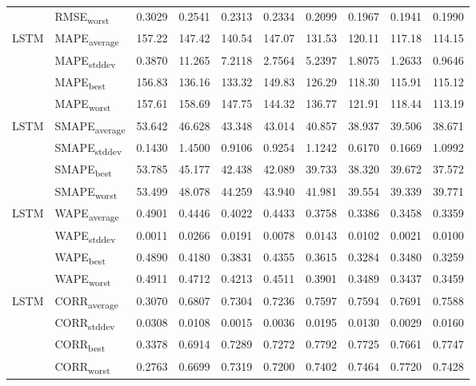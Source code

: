 {\begin{longtable}{l l c c c c c c c c}
 & RMSE\textsubscript{worst} & 0.3029 & 0.2541 & 0.2313 & 0.2334 & 0.2099 & 0.1967 & 0.1941 & 0.1990 \\
\cmidrule(lr){2-10}
\multirow{4}{*}{LSTM} & MAPE\textsubscript{average} & 157.22 & 147.42 & 140.54 & 147.07 & 131.53 & 120.11 & 117.18 & 114.15 \\
 & MAPE\textsubscript{stddev} & 0.3870 & 11.265 & 7.2118 & 2.7564 & 5.2397 & 1.8075 & 1.2633 & 0.9646 \\
 & MAPE\textsubscript{best} & 156.83 & 136.16 & 133.32 & 149.83 & 126.29 & 118.30 & 115.91 & 115.12 \\
 & MAPE\textsubscript{worst} & 157.61 & 158.69 & 147.75 & 144.32 & 136.77 & 121.91 & 118.44 & 113.19 \\
\cmidrule(lr){2-10}
\multirow{4}{*}{LSTM} & SMAPE\textsubscript{average} & 53.642 & 46.628 & 43.348 & 43.014 & 40.857 & 38.937 & 39.506 & 38.671 \\
 & SMAPE\textsubscript{stddev} & 0.1430 & 1.4500 & 0.9106 & 0.9254 & 1.1242 & 0.6170 & 0.1669 & 1.0992 \\
 & SMAPE\textsubscript{best} & 53.785 & 45.177 & 42.438 & 42.089 & 39.733 & 38.320 & 39.672 & 37.572 \\
 & SMAPE\textsubscript{worst} & 53.499 & 48.078 & 44.259 & 43.940 & 41.981 & 39.554 & 39.339 & 39.771 \\
\cmidrule(lr){2-10}
\multirow{4}{*}{LSTM} & WAPE\textsubscript{average} & 0.4901 & 0.4446 & 0.4022 & 0.4433 & 0.3758 & 0.3386 & 0.3458 & 0.3359 \\
 & WAPE\textsubscript{stddev} & 0.0011 & 0.0266 & 0.0191 & 0.0078 & 0.0143 & 0.0102 & 0.0021 & 0.0100 \\
 & WAPE\textsubscript{best} & 0.4890 & 0.4180 & 0.3831 & 0.4355 & 0.3615 & 0.3284 & 0.3480 & 0.3259 \\
 & WAPE\textsubscript{worst} & 0.4911 & 0.4712 & 0.4213 & 0.4511 & 0.3901 & 0.3489 & 0.3437 & 0.3459 \\
\cmidrule(lr){2-10}
\multirow{4}{*}{LSTM} & CORR\textsubscript{average} & 0.3070 & 0.6807 & 0.7304 & 0.7236 & 0.7597 & 0.7594 & 0.7691 & 0.7588 \\
 & CORR\textsubscript{stddev} & 0.0308 & 0.0108 & 0.0015 & 0.0036 & 0.0195 & 0.0130 & 0.0029 & 0.0160 \\
 & CORR\textsubscript{best} & 0.3378 & 0.6914 & 0.7289 & 0.7272 & 0.7792 & 0.7725 & 0.7661 & 0.7747 \\
 & CORR\textsubscript{worst} & 0.2763 & 0.6699 & 0.7319 & 0.7200 & 0.7402 & 0.7464 & 0.7720 & 0.7428 \\

\end{longtable}}
